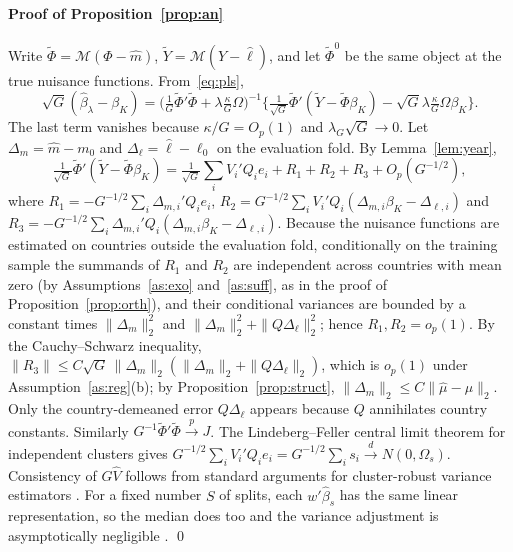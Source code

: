 \documentclass[pdflatex,sn-basic]{sn-jnl}%
\theoremstyle{thmstyleone}
\theoremstyle{thmstyletwo}
\newcommand{\M}{\mathcal{M}}
\begin{document}
\begin{appendices}
\paragraph{Proof of Proposition~\ref{prop:an}}
Write $\tilde\Phi=\M(\Phi-\hat m)$, $\tilde Y=\M(Y-\hat\ell)$, and let $\tilde\Phi^0$ be the same object at the true nuisance functions. From~\eqref{eq:pls},
\[
\sqrt G(\hat\beta_\lambda-\beta_K)=\Big(\tfrac1G\tilde\Phi'\tilde\Phi+\lambda\tfrac\kappa G\Omega\Big)^{-1}\Big\{\tfrac1{\sqrt G}\tilde\Phi'(\tilde Y-\tilde\Phi\beta_K)-\sqrt G\lambda\tfrac\kappa G\Omega\beta_K\Big\}.
\]
The last term vanishes because $\kappa/G=O_p(1)$ and $\lambda_G\sqrt G\to0$. Let $\Delta_m=\hat m-m_0$ and $\Delta_\ell=\hat\ell-\ell_0$ on the evaluation fold. By Lemma~\ref{lem:year},
\[
\tfrac1{\sqrt G}\tilde\Phi'(\tilde Y-\tilde\Phi\beta_K)=\tfrac1{\sqrt G}\sum_iV_i'Q_ie_i+R_1+R_2+R_3+O_p(G^{-1/2}),
\]
where $R_1=-G^{-1/2}\sum_i\Delta_{m,i}'Q_ie_i$, $R_2=G^{-1/2}\sum_iV_i'Q_i(\Delta_{m,i}\beta_K-\Delta_{\ell,i})$ and $R_3=-G^{-1/2}\sum_i\Delta_{m,i}'Q_i(\Delta_{m,i}\beta_K-\Delta_{\ell,i})$. Because the nuisance functions are estimated on countries outside the evaluation fold, conditionally on the training sample the summands of $R_1$ and $R_2$ are independent across countries with mean zero (by Assumptions~\ref{as:exo} and~\ref{as:suff}, as in the proof of Proposition~\ref{prop:orth}), and their conditional variances are bounded by a constant times $\|\Delta_m\|_2^2$ and $\|\Delta_m\|_2^2+\|Q\Delta_\ell\|_2^2$; hence $R_1,R_2=o_p(1)$. By the Cauchy--Schwarz inequality, $\|R_3\|\le C\sqrt G\,\|\Delta_m\|_2(\|\Delta_m\|_2+\|Q\Delta_\ell\|_2)$, which is $o_p(1)$ under Assumption~\ref{as:reg}(b); by Proposition~\ref{prop:struct}, $\|\Delta_m\|_2\le C\|\hat\mu-\mu\|_2$. Only the country-demeaned error $Q\Delta_\ell$ appears because $Q$ annihilates country constants. Similarly $G^{-1}\tilde\Phi'\tilde\Phi\xrightarrow{p}J$. The Lindeberg--Feller central limit theorem for independent clusters gives $G^{-1/2}\sum_iV_i'Q_ie_i=G^{-1/2}\sum_is_i\xrightarrow{d}N(0,\Omega_s)$. Consistency of $G\hat V$ follows from standard arguments for cluster-robust variance estimators \citep{cameron2015cluster}. For a fixed number $S$ of splits, each $w'\hat\beta_s$ has the same linear representation, so the median does too and the variance adjustment is asymptotically negligible \citep{chernozhukov2018dml}. \qed


\end{appendices}
\end{document}
